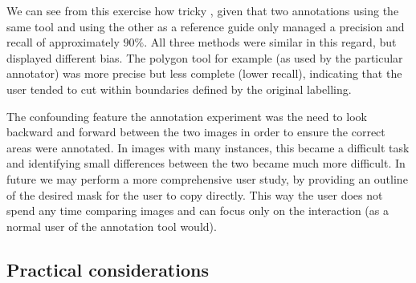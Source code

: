 \documentclass{IEEEtran}
\begin{document}
We can see from this exercise how tricky , given that two annotations using the same tool and using the other as a reference guide only managed a precision and recall of approximately $ 90\% $. All three methods were similar in this regard, but displayed different bias. The polygon tool for example (as used by the particular annotator) was more precise but less complete (lower recall), indicating that the user tended to cut within boundaries defined by the original labelling. 




\begin{table*}[!ht]
  \centering
    \caption{Statistics from annotating validation set in different ways. Precision, recall and IOU are a comparison with the original validation set. Note figures in brackets are the original statistics of the un-modified predictions from the model}

\noindent{}

\label{tab:annotation_exp}
\end{table*}


The confounding feature the annotation experiment was the need to look backward and forward between the two images in order to ensure the correct areas were annotated. In images with many instances, this became a difficult task and identifying small differences between the two became much more difficult. In future we may perform a more comprehensive user study, by providing an outline of the desired mask for the user to copy directly. This way the user does not spend any time comparing images and can focus only on the interaction (as a normal user of the annotation tool would).


\subsection{Practical considerations}
\end{document}
